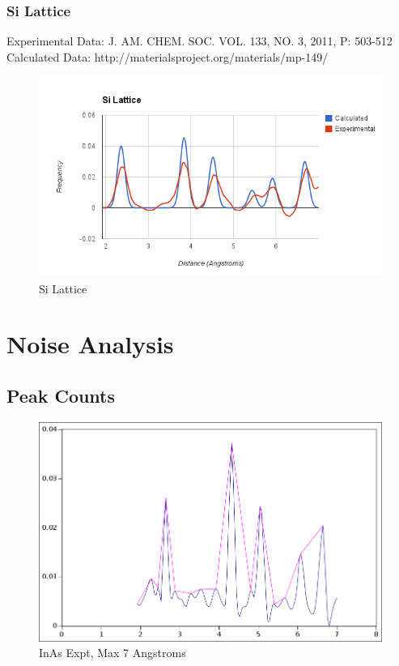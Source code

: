 \documentclass[12pt,letterpaper]{article}
\begin{document}
\subsubsection{Si Lattice}
\noindent Experimental Data: J. AM. CHEM. SOC. VOL. 133, NO. 3, 2011, P:
503-512\\
\noindent Calculated Data: http://materialsproject.org/materials/mp-149/ \\
\begin{figure}[ht]
  \begin{center}
    \includegraphics[scale=0.7]{figs/si_lattice_comparison.png}
    \caption{Si Lattice}
  \end{center}
\end{figure}

\pagebreak

\section{Noise Analysis}
\subsection{Peak Counts}
\begin{figure}[ht]
  \begin{center}
    \includegraphics[scale=0.5]{figs/inas_peaks_7ang.png}
    \caption{InAs Expt, Max 7 Angstroms}
  \end{center}
\end{figure}
\end{document}
